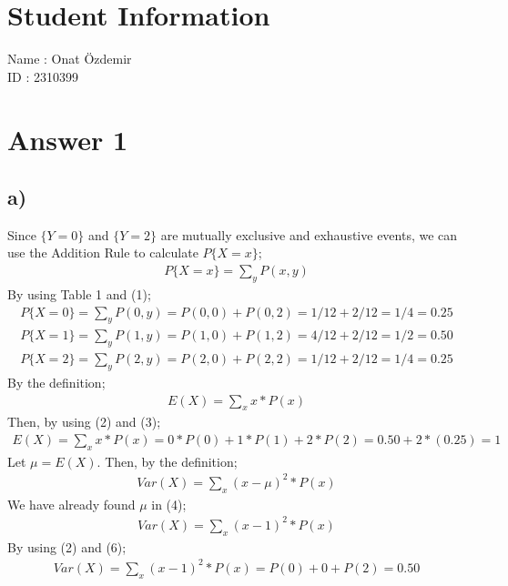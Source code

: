 \documentclass[12pt]{article}
\begin{document}
\section*{Student Information}

Name : Onat Özdemir\\

ID : 2310399\\


\section*{Answer 1}
\subsection*{a)} Since $\{Y=0\}$ and $\{Y=2\}$ are mutually exclusive and exhaustive events, we can use the Addition Rule to calculate $P\{X=x\}$;
\begin{equation} 
\begin{split}
P\{X=x\} = \sum_{y} P(x,y)
\end{split}
\end{equation}
By using Table 1 and (1);
\begin{equation} 
\begin{split}
P\{X=0\} = \sum_{y} P(0,y) = P(0,0) + P(0,2) = 1/12 + 2/12 = 1/4 = 0.25 \\
P\{X=1\} = \sum_{y} P(1,y) = P(1,0) + P(1,2) = 4/12 + 2/12 = 1/2 = 0.50 \\
P\{X=2\} = \sum_{y} P(2,y) = P(2,0) + P(2,2) = 1/12 + 2/12 = 1/4 = 0.25
\end{split}
\end{equation}
By the definition;
\begin{equation} 
\begin{split}
E(X) = \sum_{x} x*P(x)
\end{split}
\end{equation}
Then, by using (2) and (3);
\begin{equation} 
\begin{split}
E(X) = \sum_{x} x*P(x) = 0*P(0) + 1*P(1) + 2*P(2) = 0.50 + 2*(0.25) = 1
\end{split}
\end{equation}
Let $\mu = E(X) $. Then, by the definition;
\begin{equation} 
\begin{split}
Var(X) = \sum_{x} (x-\mu)^{2}*P(x)
\end{split}
\end{equation}
We have already found $\mu$ in (4);
\begin{equation} 
\begin{split}
Var(X) = \sum_{x} (x-1)^{2}*P(x)
\end{split}
\end{equation}
By using (2) and (6);
\begin{equation} 
\begin{split}
Var(X) = \sum_{x} (x-1)^{2}*P(x) = P(0) + 0 + P(2) = 0.50
\end{split}
\end{equation}
\end{document}
